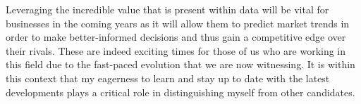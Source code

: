 \documentclass[11pt, a4paper]{awesome-cv}
\begin{document}
\begin{cvletter}
Leveraging the incredible value that is present within data will be vital for businesses in the coming years as it will allow them to predict market trends in order to make better-informed decisions and thus gain a competitive edge over their rivals. These are indeed exciting times for those of us who are working in this field due to the fast-paced evolution that we are now witnessing. It is within this context that my eagerness to learn and stay up to date with the latest developments plays a critical role in distinguishing myself from other candidates. 

\end{cvletter}

\makeletterclosing
\end{document}
